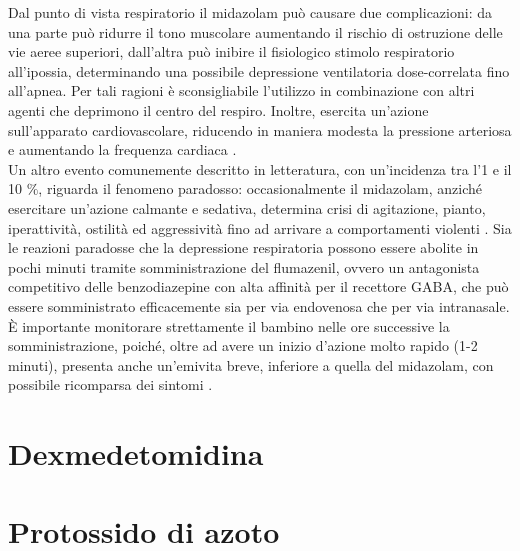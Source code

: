 Dal punto di vista respiratorio il midazolam può causare due complicazioni: da una parte può ridurre il tono muscolare aumentando il rischio di ostruzione delle vie aeree superiori, dall'altra può inibire il fisiologico stimolo respiratorio all'ipossia, determinando una possibile depressione ventilatoria dose-correlata fino all'apnea. Per tali ragioni è sconsigliabile l'utilizzo in combinazione con altri agenti che deprimono il centro del respiro. 
Inoltre, esercita un'azione sull'apparato cardiovascolare, riducendo in maniera modesta la pressione arteriosa e aumentando la frequenza cardiaca \cite{Olkkola2008}. 
\\Un altro evento comunemente descritto in letteratura, con un'incidenza tra l'1 e il 10 $\%$, riguarda il fenomeno paradosso: occasionalmente il midazolam, anziché esercitare un'azione calmante e sedativa, determina crisi di agitazione, pianto, iperattività, ostilità ed aggressività fino ad arrivare a comportamenti violenti \cite{Weinbroum2001}. Sia le reazioni paradosse che la depressione respiratoria possono essere abolite in pochi minuti tramite somministrazione del flumazenil, ovvero un antagonista competitivo delle benzodiazepine con alta affinità per il recettore GABA, che può essere somministrato efficacemente sia per via endovenosa che per via intranasale. \`E importante monitorare strettamente il bambino nelle ore successive la somministrazione, poiché, oltre ad avere un inizio d'azione molto rapido (1-2 minuti), presenta anche un'emivita breve, inferiore a quella del midazolam, con possibile ricomparsa dei sintomi \cite{Simeupsedazione, Uptodatepharmacology}.


\section{Dexmedetomidina}

\lipsum[4]

\section{Protossido di azoto}

\lipsum[5]
 